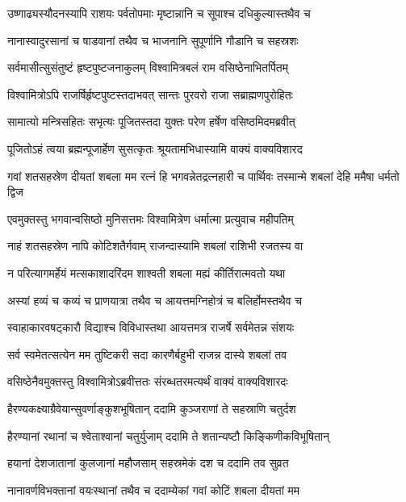 \twolineshloka
{उष्णाढ्यस्यौदनस्यापि राशयः पर्वतोपमाः}
{मृष्टान्नानि च सूपाश्च दधिकुल्यास्तथैव च} %

\twolineshloka
{नानास्वादुरसानां च षाडवानां तथैव च}
{भाजनानि सुपूर्णानि गौडानि च सहस्रशः} %

\twolineshloka
{सर्वमासीत्सुसंतुष्टं हृष्टपुष्टजनाकुलम्}
{विश्वामित्रबलं राम वसिष्ठेनाभितर्पितम्} %

\twolineshloka
{विश्वामित्रोऽपि राजर्षिर्हृष्टपुष्टस्तदाभवत्}
{सान्तः पुरवरो राजा सब्राह्मणपुरोहितः} %

\twolineshloka
{सामात्यो मन्त्रिसहितः सभृत्यः पूजितस्तदा}
{युक्तः परेण हर्षेण वसिष्ठमिदमब्रवीत्} %

\twolineshloka
{पूजितोऽहं त्वया ब्रह्मन्पूजार्हेण सुसत्कृतः}
{श्रूयतामभिधास्यामि वाक्यं वाक्यविशारद} %

\threelineshloka
{गवां शतसहस्रेण दीयतां शबला मम}
{रत्नं हि भगवन्नेतद्रत्नहारी च पार्थिवः}
{तस्मान्मे शबलां देहि ममैषा धर्मतो द्विज} %

\twolineshloka
{एवमुक्तस्तु भगवान्वसिष्ठो मुनिसत्तमः}
{विश्वामित्रेण धर्मात्मा प्रत्युवाच महीपतिम्} %

\twolineshloka
{नाहं शतसहस्रेण नापि कोटिशतैर्गवाम्}
{राजन्दास्यामि शबलां राशिभी रजतस्य वा} %

\twolineshloka
{न परित्यागमर्हेयं मत्सकाशादरिंदम}
{शाश्वती शबला मह्यं कीर्तिरात्मवतो यथा} %

\twolineshloka
{अस्यां हव्यं च कव्यं च प्राणयात्रा तथैव च}
{आयत्तमग्निहोत्रं च बलिर्होमस्तथैव च} %

\twolineshloka
{स्वाहाकारवषट्कारौ विद्याश्च विविधास्तथा}
{आयत्तमत्र राजर्षे सर्वमेतन्न संशयः} %

\twolineshloka
{सर्व स्वमेतत्सत्येन मम तुष्टिकरी सदा}
{कारणैर्बहुभी राजन्न दास्ये शबलां तव} %

\twolineshloka
{वसिष्ठेनैवमुक्तस्तु विश्वामित्रोऽब्रवीत्ततः}
{संरब्धतरमत्यर्थं वाक्यं वाक्यविशारदः} %

\twolineshloka
{हैरण्यकक्ष्याग्रैवेयान्सुवर्णाङ्कुशभूषितान्}
{ददामि कुञ्जराणां ते सहस्राणि चतुर्दश} %

\twolineshloka
{हैरण्यानां रथानां च श्वेताश्वानां चतुर्युजाम्}
{ददामि ते शतान्यष्टौ किङ्किणीकविभूषितान्} %

\twolineshloka
{हयानां देशजातानां कुलजानां महौजसाम्}
{सहस्रमेकं दश च ददामि तव सुव्रत} %

\twolineshloka
{नानावर्णविभक्तानां वयःस्थानां तथैव च}
{ददाम्येकां गवां कोटिं शबला दीयतां मम} %

